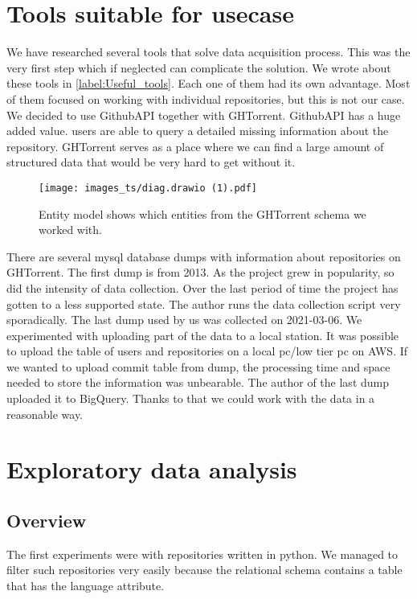 \documentclass[thesis=M,english]{FITthesis}[2019/12/23]
\begin{document}
\section{Tools suitable for usecase}
We have researched several tools that solve data acquisition process. This was the very first step which if neglected can complicate the solution. We wrote about these tools in \ref{label:Useful_tools}. Each one of them had its own advantage. Most of them focused on working with individual repositories, but this is not our case. We decided to use GithubAPI together with GHTorrent. GithubAPI has a huge added value. users are able to query a detailed missing information about the repository. GHTorrent serves as a place where we can find a large amount of structured data that would be very hard to get without it.

\begin{figure}[ht!]
    \texttt{[image: images\_ts/diag.drawio (1).pdf]}
    \caption{Entity model shows which entities from the GHTorrent schema we worked with.} 
    \label{fig:relation_in_data}
    \centering
\end{figure}

There are several mysql database dumps with information about repositories on GHTorrent. The first dump is from 2013. As the project grew in popularity, so did the intensity of data collection. Over the last period of time the project has gotten to a less supported state. The author runs the data collection script very sporadically. The last dump used by us was collected on 2021-03-06. We experimented with uploading part of the data to a local station. It was possible to upload the table of users and repositories on a local pc/low tier pc on AWS. If we wanted to upload commit table from dump, the processing time and space needed to store the information was unbearable. The author of the last dump uploaded it to BigQuery. Thanks to that we could work with the data in a reasonable way.
\newpage
\section{Exploratory data analysis}
\label{label:Exploratory_data_analysis}

\subsection{Overview}
The first experiments were with repositories written in python. We managed to filter such repositories very easily because the relational schema contains a table that has the language attribute.
\end{document}
